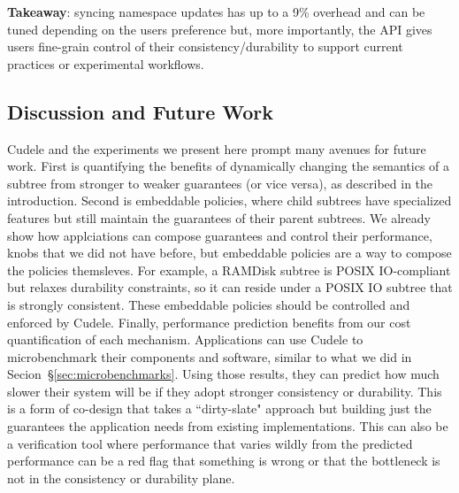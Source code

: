 \textbf{Takeaway}: syncing namespace updates has up to a 9\% overhead and can
be tuned depending on the users preference but, more importantly, the API gives
users fine-grain control of their consistency/durability to support current
practices or experimental workflows.

%
%

\subsection{Discussion and Future Work}

Cudele and the experiments we present here prompt many avenues for future work.
First is quantifying the benefits of dynamically changing the semantics of a
subtree from stronger to weaker guarantees (or vice versa), as described in the
introduction. Second is embeddable policies, where child subtrees have
specialized features but still maintain the guarantees  of their parent
subtrees. We already show how applciations can compose guarantees and control
their performance, knobs that we did not have before, but embeddable policies
are a way to compose the policies themsleves.  For example, a RAMDisk subtree
is POSIX IO-compliant but relaxes durability constraints, so it can reside
under a POSIX IO subtree that is strongly consistent. These embeddable policies
should be controlled and enforced by Cudele.  Finally, performance prediction
benefits from our cost quantification of each mechanism. Applications can use
Cudele to microbenchmark their components and software, similar to what we did
in Secion~\S\ref{sec:microbenchmarks}. Using those results, they can predict
how much slower their system will be if they adopt stronger consistency or
durability.  This is a form of co-design that takes a ``dirty-slate" approach
but building just the guarantees the application needs from existing
implementations.  This can also be a verification tool where performance that
varies wildly from the predicted performance can be a red flag that something
is wrong or that the bottleneck is not in the consistency or durability plane.

